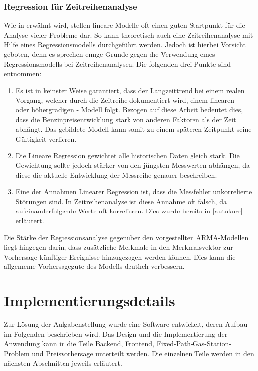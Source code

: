 \documentclass[
ngerman          %
,a4paper          %
,11pt
,pdftex
]{report}
\begin{document}
\subsection{Regression für Zeitreihenanalyse}
Wie in \cite[72]{mlalgos} erwähnt wird, stellen lineare Modelle oft einen guten Startpunkt für die Analyse vieler Probleme dar. So kann theoretisch auch eine Zeitreihenanalyse mit Hilfe eines Regressionsmodells durchgeführt werden. Jedoch ist hierbei Vorsicht geboten, denn es sprechen einige Gründe gegen die Verwendung eines Regressionsmodells bei Zeitreihenanalysen. Die folgenden drei Punkte sind \cite[150]{thinkstats} entnommen:

\begin{enumerate}
	\item Es ist in keinster Weise garantiert, dass der Langzeittrend bei einem realen Vorgang, welcher durch die Zeitreihe dokumentiert wird, einem linearen - oder höhergradigen - Modell folgt. Bezogen auf diese Arbeit bedeutet dies, dass die Benzinpreisentwicklung stark von anderen Faktoren als der Zeit abhängt. Das gebildete Modell kann somit zu einem späteren Zeitpunkt seine Gültigkeit verlieren.
	\item Die Lineare Regression gewichtet alle historischen Daten gleich stark. Die Gewichtung sollte jedoch stärker von den jüngsten Messwerten abhängen, da diese die aktuelle Entwicklung der Messreihe genauer beschreiben.
	\item Eine der Annahmen Linearer Regression ist, dass die Messfehler unkorrelierte Störungen sind. In Zeitreihenanalyse ist diese Annahme oft falsch, da aufeinanderfolgende Werte oft korrelieren. Dies wurde bereits in \autoref{autokorr} erläutert.
\end{enumerate}

Die Stärke der Regressionsanalyse gegenüber den vorgestellten \ac{ARMA}-Modellen liegt hingegen darin, dass zusätzliche Merkmale in den Merkmalsvektor zur Vorhersage künftiger Ereignisse hinzugezogen werden können. Dies kann die allgemeine Vorhersagegüte des Modells deutlich verbessern.


\chapter{Implementierungsdetails}
Zur Lösung der Aufgabenstellung wurde eine Software entwickelt, deren Aufbau im Folgenden beschrieben wird. Das Design und die Implementierung der Anwendung kann in die Teile Backend, Frontend, Fixed-Path-Gas-Station-Problem und Preisvorhersage unterteilt werden. Die einzelnen Teile werden in den nächsten Abschnitten jeweils erläutert.
\end{document}
